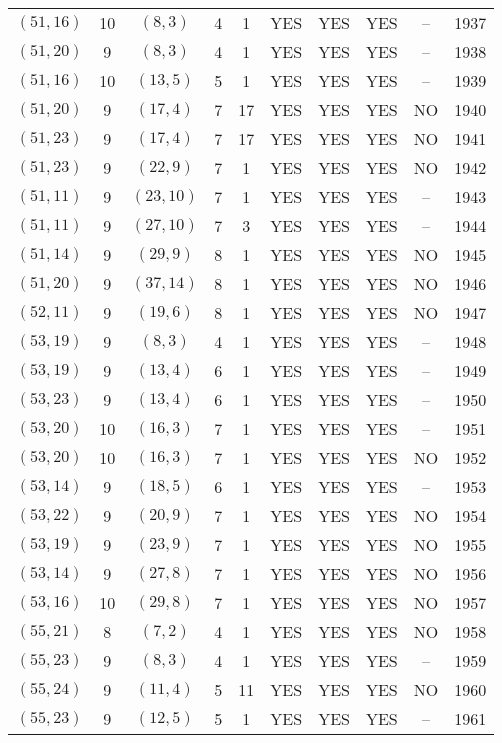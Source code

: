 \begin{longtable}{|c|c|c|c|c|c|c|c|c|c|}
$(51, 16)$ & 10 & $(8, 3)$ & 4 & 1 & YES & YES & YES & -- & 1937\\
$(51, 20)$ & 9 & $(8, 3)$ & 4 & 1 & YES & YES & YES & -- & 1938\\
$(51, 16)$ & 10 & $(13, 5)$ & 5 & 1 & YES & YES & YES & -- & 1939\\
$(51, 20)$ & 9 & $(17, 4)$ & 7 & 17 & YES & YES & YES & NO & 1940\\
$(51, 23)$ & 9 & $(17, 4)$ & 7 & 17 & YES & YES & YES & NO & 1941\\
$(51, 23)$ & 9 & $(22, 9)$ & 7 & 1 & YES & YES & YES & NO & 1942\\
$(51, 11)$ & 9 & $(23, 10)$ & 7 & 1 & YES & YES & YES & -- & 1943\\
$(51, 11)$ & 9 & $(27, 10)$ & 7 & 3 & YES & YES & YES & -- & 1944\\
$(51, 14)$ & 9 & $(29, 9)$ & 8 & 1 & YES & YES & YES & NO & 1945\\
$(51, 20)$ & 9 & $(37, 14)$ & 8 & 1 & YES & YES & YES & NO & 1946\\
$(52, 11)$ & 9 & $(19, 6)$ & 8 & 1 & YES & YES & YES & NO & 1947\\
$(53, 19)$ & 9 & $(8, 3)$ & 4 & 1 & YES & YES & YES & -- & 1948\\
$(53, 19)$ & 9 & $(13, 4)$ & 6 & 1 & YES & YES & YES & -- & 1949\\
$(53, 23)$ & 9 & $(13, 4)$ & 6 & 1 & YES & YES & YES & -- & 1950\\
$(53, 20)$ & 10 & $(16, 3)$ & 7 & 1 & YES & YES & YES & -- & 1951\\
$(53, 20)$ & 10 & $(16, 3)$ & 7 & 1 & YES & YES & YES & NO & 1952\\
$(53, 14)$ & 9 & $(18, 5)$ & 6 & 1 & YES & YES & YES & -- & 1953\\
$(53, 22)$ & 9 & $(20, 9)$ & 7 & 1 & YES & YES & YES & NO & 1954\\
$(53, 19)$ & 9 & $(23, 9)$ & 7 & 1 & YES & YES & YES & NO & 1955\\
$(53, 14)$ & 9 & $(27, 8)$ & 7 & 1 & YES & YES & YES & NO & 1956\\
$(53, 16)$ & 10 & $(29, 8)$ & 7 & 1 & YES & YES & YES & NO & 1957\\
$(55, 21)$ & 8 & $(7, 2)$ & 4 & 1 & YES & YES & YES & NO & 1958\\
$(55, 23)$ & 9 & $(8, 3)$ & 4 & 1 & YES & YES & YES & -- & 1959\\
$(55, 24)$ & 9 & $(11, 4)$ & 5 & 11 & YES & YES & YES & NO & 1960\\
$(55, 23)$ & 9 & $(12, 5)$ & 5 & 1 & YES & YES & YES & -- & 1961\\

\end{longtable}
